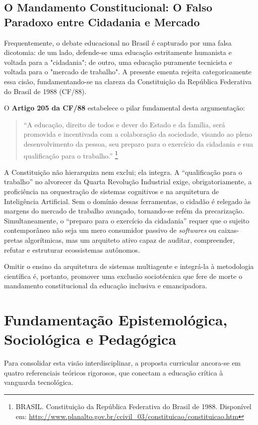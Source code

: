 \documentclass[12pt,a4paper]{article}
\begin{document}
\subsection{O Mandamento Constitucional: O Falso Paradoxo entre Cidadania e Mercado}
Frequentemente, o debate educacional no Brasil é capturado por uma falsa dicotomia: de um lado, defende-se uma educação estritamente humanista e voltada para a "cidadania"; de outro, uma educação puramente tecnicista e voltada para o "mercado de trabalho". A presente ementa rejeita categoricamente essa cisão, fundamentando-se na clareza da Constituição da República Federativa do Brasil de 1988 (CF/88).

O \textbf{Artigo 205 da CF/88} estabelece o pilar fundamental desta argumentação:
\begin{quote}
    ``A educação, direito de todos e dever do Estado e da família, será promovida e incentivada com a colaboração da sociedade, visando ao pleno desenvolvimento da pessoa, seu preparo para o exercício da cidadania e sua qualificação para o trabalho.'' \footnote{BRASIL. Constituição da República Federativa do Brasil de 1988. Disponível em: \url{http://www.planalto.gov.br/ccivil_03/constituicao/constituicao.htm}}
\end{quote}

A Constituição não hierarquiza nem exclui; ela integra. A ``qualificação para o trabalho'' no alvorecer da Quarta Revolução Industrial exige, obrigatoriamente, a proficiência na orquestração de sistemas cognitivos e na arquitetura de Inteligência Artificial. Sem o domínio dessas ferramentas, o cidadão é relegado às margens do mercado de trabalho avançado, tornando-se refém da precarização. Simultaneamente, o ``preparo para o exercício da cidadania'' requer que o sujeito contemporâneo não seja um mero consumidor passivo de \textit{softwares} ou caixas-pretas algorítmicas, mas um arquiteto ativo capaz de auditar, compreender, refutar e estruturar ecossistemas autônomos. 

Omitir o ensino da arquitetura de sistemas multiagente e integrá-la à metodologia científica é, portanto, promover uma exclusão sociotécnica que fere de morte o mandamento constitucional da educação inclusiva e emancipadora.

\section{Fundamentação Epistemológica, Sociológica e Pedagógica}

Para consolidar esta visão interdisciplinar, a proposta curricular ancora-se em quatro referenciais teóricos rigorosos, que conectam a educação crítica à vanguarda tecnológica.
\end{document}
